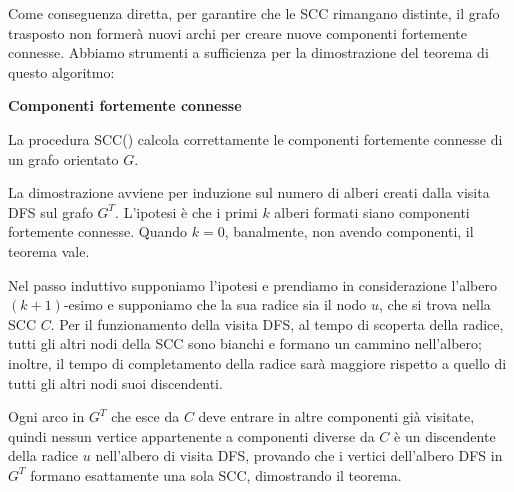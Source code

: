\noindent Come conseguenza diretta, per garantire che le SCC rimangano distinte, il grafo trasposto non formerà nuovi archi per creare nuove componenti fortemente connesse. Abbiamo strumenti a sufficienza per la dimostrazione del teorema di questo algoritmo: \begin{teorema}
	\textbf{Componenti fortemente connesse}\par
	\noindent La procedura SCC() calcola correttamente le componenti fortemente connesse di un grafo orientato $G$.
\end{teorema}
\noindent La dimostrazione avviene per induzione sul numero di alberi creati dalla visita DFS sul grafo $G^T$. L'ipotesi è che i primi $k$ alberi formati siano componenti fortemente connesse. Quando $k=0$, banalmente, non avendo componenti, il teorema vale.\par
Nel passo induttivo supponiamo l'ipotesi e prendiamo in considerazione l'albero $(k+1)$-esimo e supponiamo che la sua radice sia il nodo $u$, che si trova nella SCC $C$. Per il funzionamento della visita DFS, al tempo di scoperta della radice, tutti gli altri nodi della SCC sono bianchi e formano un cammino nell'albero; inoltre, il tempo di completamento della radice sarà maggiore rispetto a quello di tutti gli altri nodi suoi discendenti.\par
Ogni arco in $G^T$ che esce da $C$ deve entrare in altre componenti già visitate, quindi nessun vertice appartenente a componenti diverse da $C$ è un discendente della radice $u$ nell'albero di visita DFS, provando che i vertici dell'albero DFS in $G^T$ formano esattamente una sola SCC, dimostrando il teorema.

%


